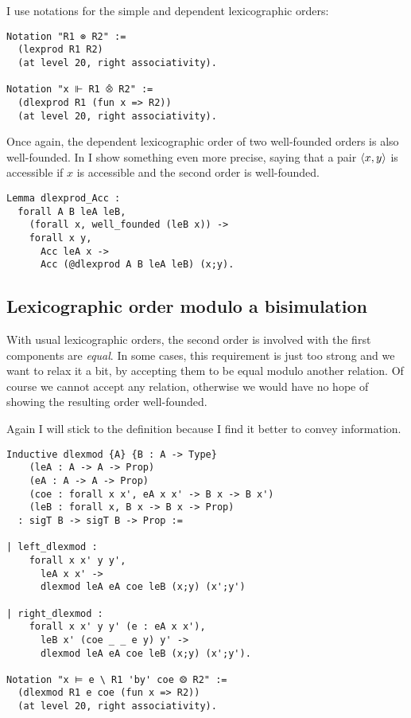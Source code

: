 I use notations for the simple and dependent lexicographic orders:
\begin{verbatim}
Notation "R1 ⊗ R2" :=
  (lexprod R1 R2)
  (at level 20, right associativity).

Notation "x ⊩ R1 ⨶ R2" :=
  (dlexprod R1 (fun x => R2))
  (at level 20, right associativity).
\end{verbatim}

Once again, the dependent lexicographic order of two well-founded orders is also
well-founded. In \Coq I show something even more precise, saying that a pair
\(\langle x,y \rangle\) is accessible if \(x\) is accessible and the second order is
well-founded.
\begin{verbatim}
Lemma dlexprod_Acc :
  forall A B leA leB,
    (forall x, well_founded (leB x)) ->
    forall x y,
      Acc leA x ->
      Acc (@dlexprod A B leA leB) (x;y).
\end{verbatim}


\subsection{Lexicographic order modulo a bisimulation}

With usual lexicographic orders, the second order is involved with the first
components are \emph{equal}. In some cases, this requirement is just too strong
and we want to relax it a bit, by accepting them to be equal modulo another
relation. Of course we cannot accept any relation, otherwise we would have no
hope of showing the resulting order well-founded.

Again I will stick to the \Coq definition because I find it better to convey
information.

\begin{verbatim}
Inductive dlexmod {A} {B : A -> Type}
    (leA : A -> A -> Prop)
    (eA : A -> A -> Prop)
    (coe : forall x x', eA x x' -> B x -> B x')
    (leB : forall x, B x -> B x -> Prop)
  : sigT B -> sigT B -> Prop :=

| left_dlexmod :
    forall x x' y y',
      leA x x' ->
      dlexmod leA eA coe leB (x;y) (x';y')

| right_dlexmod :
    forall x x' y y' (e : eA x x'),
      leB x' (coe _ _ e y) y' ->
      dlexmod leA eA coe leB (x;y) (x';y').

Notation "x ⊨ e \ R1 'by' coe ⨷ R2" :=
  (dlexmod R1 e coe (fun x => R2))
  (at level 20, right associativity).
\end{verbatim}

